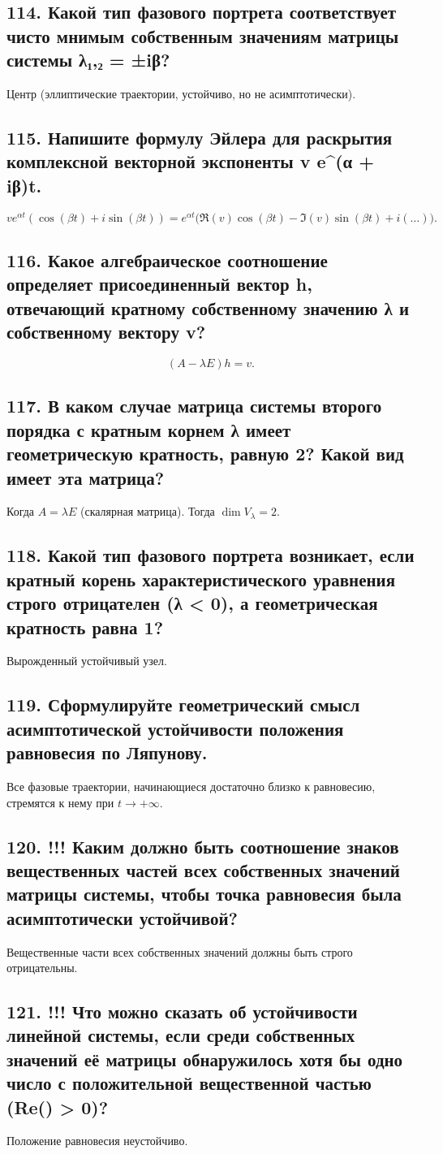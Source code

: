 \documentclass[a4paper,12pt]{article}
\begin{document}
\subsection*{114. Какой тип фазового портрета соответствует чисто мнимым собственным значениям матрицы системы λ₁,₂ = ±iβ?}
Центр (эллиптические траектории, устойчиво, но не асимптотически).

\subsection*{115. Напишите формулу Эйлера для раскрытия комплексной векторной экспоненты v e^{(α + iβ)t}.}
\[ v e^{\alpha t} (\cos(\beta t) + i \sin(\beta t)) = e^{\alpha t} \big( \Re(v) \cos(\beta t) - \Im(v) \sin(\beta t) + i(\dots) \big). \]

\subsection*{116. Какое алгебраическое соотношение определяет присоединенный вектор h, отвечающий кратному собственному значению λ и собственному вектору v?}
\[ (A - \lambda E) h = v. \]

\subsection*{117. В каком случае матрица системы второго порядка с кратным корнем λ имеет геометрическую кратность, равную 2? Какой вид имеет эта матрица?}
Когда \(A = \lambda E\) (скалярная матрица). Тогда \(\dim V_\lambda = 2\).

\subsection*{118. Какой тип фазового портрета возникает, если кратный корень характеристического уравнения строго отрицателен (λ < 0), а геометрическая кратность равна 1?}
Вырожденный устойчивый узел.

\subsection*{119. Сформулируйте геометрический смысл асимптотической устойчивости положения равновесия по Ляпунову.}
Все фазовые траектории, начинающиеся достаточно близко к равновесию, стремятся к нему при \(t \to +\infty\).

\subsection*{120. !!! Каким должно быть соотношение знаков вещественных частей всех собственных значений матрицы системы, чтобы точка равновесия была асимптотически устойчивой?}
Вещественные части всех собственных значений должны быть строго отрицательны.

\subsection*{121. !!! Что можно сказать об устойчивости линейной системы, если среди собственных значений её матрицы обнаружилось хотя бы одно число с положительной вещественной частью (Re(\lambda) > 0)?}
Положение равновесия неустойчиво.
\end{document}
